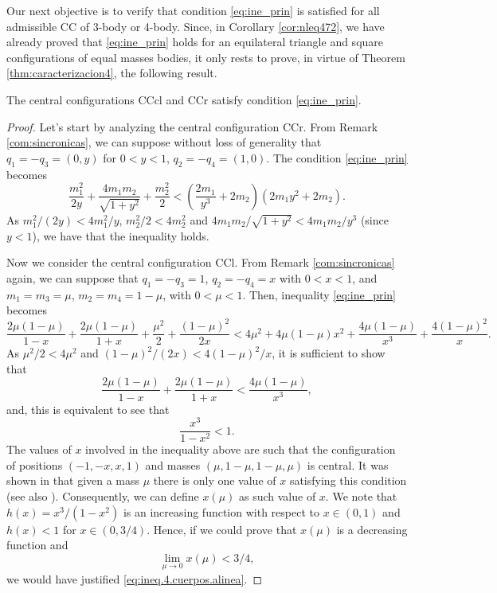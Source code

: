 \documentclass[smallcondensed]{svjour3}
\begin{document}
Our next objective is to verify that condition \eqref{eq:ine_prin} is satisfied for all admissible   CC of 3-body or 4-body. Since,  in  Corollary \ref{cor:nleq472}, we have already proved that \eqref{eq:ine_prin} holds for an equilateral triangle and square configurations of equal masses bodies, it only rests to prove, in virtue of Theorem \ref{thm:caracterizacion4}, the following result.




\begin{theorem}\label{thm:CC.3.4.satis.cond.adm}
The central configurations CCcl and CCr satisfy condition \eqref{eq:ine_prin}.
\end{theorem}



\begin{proof}

Let's start by analyzing the central configuration CCr. From  Remark \ref{com:sincronicas}, we can suppose without loss of generality that $ q_1 = -q_3 = (0, y) $ for $ 0<y<1 $, $ q_2 = -q_4 = (1,0) $. The condition \eqref{eq:ine_prin} becomes
\[\frac{m_1^2}{2y}+\frac{4m_1m_2}{\sqrt{1+y^2}}+\frac{m_2^2}{2}<\left(\frac{2m_1}{y^3}+2m_2\right) \left(2m_1y^2+2m_2\right).\]
As $m_1^2/(2y)<4m_1^2/y$, $m_2^2/2<4m_2^2$ and $4m_1m_2/\sqrt{1+y^2}<4m_1m_2/y^3$ (since $y<1$), we have that the inequality holds.

 Now we consider the central configuration CCl. From Remark \ref{com:sincronicas} again, we can suppose  that $q_1=-q_3=1$, $q_2=-q_4=x$ with $0<x<1$, and $m_1=m_3=\mu$, $m_2=m_4=1-\mu$, with $0<\mu<1$.  Then, inequality \eqref{eq:ine_prin} becomes
\[\frac{2\mu(1-\mu)}{1-x} +\frac{2\mu(1-\mu)}{1+x}+\frac{\mu^2}{2}+\frac{(1-\mu)^2}{2x}<4\mu^2+4\mu(1-\mu)x^2+\frac{4\mu(1-\mu)}{x^3}+\frac{4(1-\mu)^2}{x}.\]
As $ \mu ^ 2/2 <4 \mu^2$ and $ (1-\mu)^2/(2x)< 4(1-\mu)^2/x $, it is sufficient to show that
\[\frac{2\mu(1-\mu)}{1-x} +\frac{2\mu(1-\mu)}{1+x}<\frac{4\mu(1-\mu)}{x^3},\]
and, this is equivalent to see that
\begin{equation}\label{eq:ineq.4.cuerpos.alinea}
\frac{x^3}{1-x^2}<1.
\end{equation}
The values of $x$ involved in the  inequality above are such that the configuration of positions $(-1,-x,x,1)$ and masses $(\mu,1-\mu,1-\mu,\mu)$ is central. It was shown in \cite{moulton1910straight} that given a mass $\mu$ there is only one value of $x$ satisfying this condition (see also \cite{shoaib2011collinear}). Consequently, we can define $x(\mu)$ as such value of $x$.  We note that $h(x)=x^3/(1-x^2)$ is an increasing function with respect to $x\in (0,1)$ and $h(x)< 1$ for $x\in (0,3/4)$. Hence, if we could prove that $x(\mu)$ is a decreasing function and
\begin{equation}\label{eq:ineq.4.cuerpos.lim0}
\lim\limits_{\mu\to 0}x(\mu)<3/4,
\end{equation}
we would have justified \eqref {eq:ineq.4.cuerpos.alinea}.


\end{proof}
\end{document}
